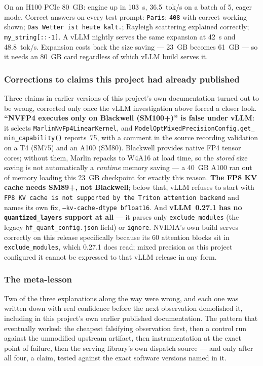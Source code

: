 \documentclass[11pt]{article}
\begin{document}
On an H100 PCIe 80~GB: engine up in 103~s, 36.5~tok/s on a batch of 5, eager mode.
Correct answers on every test prompt: \texttt{Paris}; \texttt{408} with correct working
shown; \texttt{Das Wetter ist heute kalt.}; Rayleigh scattering explained correctly;
\texttt{my\_string[::-1]}. A vLLM nightly serves the same expansion at 42~s and
48.8~tok/s. Expansion costs back the size saving --- 23~GB becomes 61~GB --- so it needs
an 80~GB card regardless of which vLLM build serves it.

\subsubsection*{Corrections to claims this project had already published}
Three claims in earlier versions of this project's own documentation turned out to be
wrong, corrected only once the vLLM investigation above forced a closer look.
\textbf{``NVFP4 executes only on Blackwell (SM100+)'' is false under vLLM}: it selects
\texttt{MarlinNvFp4LinearKernel}, and \texttt{ModelOptMixedPrecisionConfig.get\_\allowbreak
min\_capability()} reports~75, with a comment in the source recording validation on a T4
(SM75) and an A100 (SM80). Blackwell provides native FP4 tensor cores; without them,
Marlin repacks to W4A16 at load time, so the \emph{stored} size saving is not
automatically a \emph{runtime} memory saving --- a 40~GB A100 ran out of memory loading
this 23~GB checkpoint for exactly this reason. \textbf{The FP8 KV cache needs SM89+, not
Blackwell}; below that, vLLM refuses to start with \texttt{FP8 KV cache is not supported
by the Triton attention backend} and names its own fix, \texttt{--kv-cache-dtype
bfloat16}. And \textbf{vLLM~0.27.1 has no \texttt{quantized\_layers} support at all} ---
it parses only \texttt{exclude\_modules} (the legacy \texttt{hf\_quant\_config.json}
field) or \texttt{ignore}. NVIDIA's own build serves correctly on this release
specifically because its 60 attention blocks sit in \texttt{exclude\_modules}, which
0.27.1 does read; mixed precision as this project configured it cannot be expressed to
that vLLM release in any form.

\subsubsection*{The meta-lesson}
Two of the three explanations along the way were wrong, and each one was written down
with real confidence before the next observation demolished it, including in this
project's own earlier published documentation. The pattern that eventually worked: the
cheapest falsifying observation first, then a control run against the unmodified
upstream artifact, then instrumentation at the exact point of failure, then the serving
library's own dispatch source --- and only after all four, a claim, tested against the
exact software versions named in it.
\end{document}
